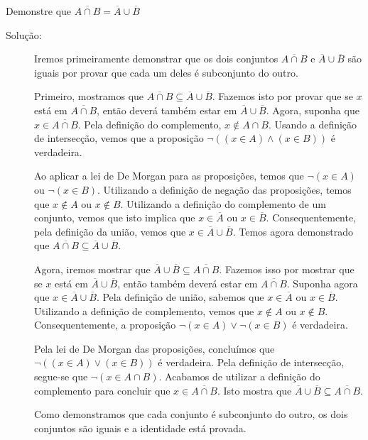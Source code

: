 \begin{exmp}
\label{exem325}
Demonstre que $\overline{A \cap B} = \overline{A} \cup \overline{B}$
\begin{description}
\item[Solução:] Iremos primeiramente demonstrar que os dois conjuntos
$\overline{A \cap B}$ e $\overline{A} \cup \overline{B}$ são iguais por provar
que cada um deles é subconjunto do outro. 

Primeiro, mostramos que $\overline{A \cap B} \subseteq \overline{A} \cup
\overline{B}$. Fazemos isto por provar que se $x$ está em $\overline{A \cap B}$,
então deverá também estar em $\overline{A} \cup \overline{B}$. Agora, suponha
que $x \in \overline{A \cap B}$. Pela definição do complemento, $x \notin A
\cap B$. Usando a definição de intersecção, vemos que a proposição $\lnot ((x
\in A) \land (x \in B))$ é verdadeira.

Ao aplicar a lei de De Morgan para as proposições, temos que $\lnot(x \in A)$ ou
$\lnot(x \in B)$. Utilizando a definição de negação das proposições, temos que
$x \notin A$ ou $x \notin B$. Utilizando a definição do complemento de um
conjunto, vemos que isto implica que $x \in \overline{A}$ ou $x \in
\overline{B}$. Consequentemente, pela definição da união, vemos que $x \in
\overline{A} \cup \overline{B}$. Temos agora demonstrado que $\overline{A
\cap B} \subseteq \overline{A} \cup \overline{B}$.

Agora, iremos mostrar que $\overline{A} \cup \overline{B} \subseteq
\overline{A \cap B}$. Fazemos isso por mostrar que se $x$ está em $\overline{A}
\cup \overline{B}$, então também deverá estar em $\overline{A \cap B}$. Suponha
agora que $x \in \overline{A} \cup \overline{B}$. Pela definição de união,
sabemos que $x \in \overline{A}$ ou $x \in \overline{B}$. Utilizando a definição
de complemento, vemos que $x \notin A$ ou $x \notin B$. Consequentemente, a
proposição $\lnot (x \in A) \lor \lnot (x \in B)$ é verdadeira.

Pela lei de De Morgan das proposições, concluímos que $\lnot ((x \in A) \lor
(x \in B))$ é verdadeira. Pela definição de intersecção, segue-se que $\lnot
(x \in A \cap B)$. Acabamos de utilizar a definição do complemento para concluir
que $x \in \overline{A \cap B}$. Isto mostra que $\overline{A} \cup
\overline{B} \subseteq \overline{A \cap B}$.

Como demonstramos que cada conjunto é subconjunto do outro, os dois conjuntos
são iguais e a identidade está provada.
\end{description}
\end{exmp}

